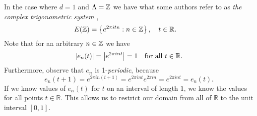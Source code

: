 \documentclass[../thesis.tex]{subfiles}
\begin{document}
\begin{example}
    In the case where $d=1$ and $\Lambda = \mathbb{Z}$ we have what some authors refer to as \emph{the complex trigonometric system} \cite{heilMetricsNormsInner2018} \cite{encyclopediaofmathematicsTrigonometricSystem},
    \begin{align}
        E(\mathbb{Z}) &= \left\{e^{2\pi i t n} : n \in \mathbb{Z}\right\}, \quad t\in \mathbb{R}.
    \end{align}
    Note that for an arbitrary $n \in \mathbb{Z}$ we have
    \begin{equation}
        \left|e_{n}(t) \right|= \left|e^{2 \pi i n t}\right| = 1 \quad \text{for all } t\in \mathbb{R}.
    \end{equation}
    Furthermore, observe that $e_n$ is 1-\emph{periodic}, because
    \begin{equation}
        e_n(t+1) = e^{2 \pi i n (t+1)} = e^{2 \pi i n t} e^{2 \pi i n} = e^{2 \pi i n t} = e_n(t).
    \end{equation}
    If we know values of $e_n(t)$ for $t$ on an interval of length $1$, we know the values for all points $t\in \mathbb{R}$. This allows us to restrict our domain from all of $\mathbb{R}$ to the unit interval $[0,1]$.
\end{example}

\end{document}
